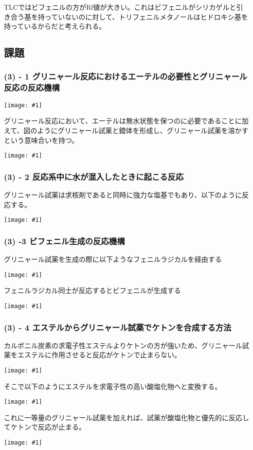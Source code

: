 \documentclass[a4paper,papersize,dvipdfmx]{jsarticle}
\newcommand{\pict}[2]{\begin{center} \texttt{[image: \#1]} \end{center}}   %
\begin{document}
TLCではビフェニルの方がRf値が大きい。これはビフェニルがシリカゲルと引き合う基を持っていないのに対して、トリフェニルメタノールはヒドロキシ基を持っているからだと考えられる。

\subsection*{課題}

\subsubsection*{(3) - 1 グリニャール反応におけるエーテルの必要性とグリニャール反応の反応機構}

\pict{imgs/4-1.jpeg}{10}

グリニャール反応において、エーテルは無水状態を保つのに必要であることに加えて、図のようにグリニャール試薬と錯体を形成し、グリニャール試薬を溶かすという意味合いを持つ。

\pict{imgs/4-2.jpeg}{4}


\subsubsection*{(3) - 2 反応系中に水が混入したときに起こる反応}

グリニャール試薬は求核剤であると同時に強力な塩基でもあり、以下のように反応する。

\pict{imgs/4-3.jpeg}{10}

\subsubsection*{(3) -3 ビフェニル生成の反応機構}

グリニャール試薬を生成の際に以下ようなフェニルラジカルを経由する
\pict{imgs/4-4.jpeg}{10}
フェニルラジカル同士が反応するとビフェニルが生成する
\pict{imgs/4-5.jpeg}{7.5}

\subsubsection*{(3) - 4 エステルからグリニャール試薬でケトンを合成する方法}
カルボニル炭素の求電子性エステルよりケトンの方が強いため、グリニャール試薬をエステルに作用させると反応がケトンで止まらない。
\pict{imgs/4-6.jpeg}{10}
そこで以下のようにエステルを求電子性の高い酸塩化物へと変換する。
\pict{imgs/4-7.jpeg}{10}
これに一等量のグリニャール試薬を加えれば、試薬が酸塩化物と優先的に反応してケトンで反応が止まる。
\pict{imgs/4-8.jpeg}{10}
\end{document}
